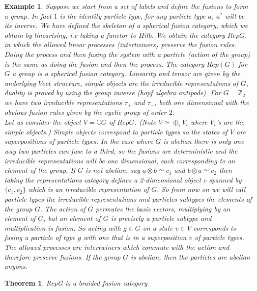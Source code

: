 \documentclass{article}
\newtheorem{example}{Example}
\newtheorem{theorem}{Theorem}
\begin{document}
\begin{example}
Suppose we start from a set of labels and define the fusions to form a group. In fact $1$ is the identity particle type, for any particle type $a$, $a^*$ will be its inverse. We have defined the skeleton of a spherical fusion category, which we obtain by linearising, i.e taking a functor to $Hilb$. We obtain the category $RepG$, in which the allowed linear processes (intertwiners) preserve the fusion rules. Doing the process and then fusing the system with a particle (action of the group) is the same as doing the fusion and then the process. 
The category $Rep(G)$ for $G$ a group is a spherical fusion category. Linearity and tensor are given by the underlying $Vect$ structure, simple objects are the irreducible representations of $G$, duality is proved by using the group inverse (hopf algebra antipode). For $G=\mathbb{Z}_2$ we have two irreducible representations $\tau_+$ and $\tau_-$, both one dimensional with the obvious fusion rules given by the cyclic group of order $2$.\\
Let us consider the object $V=\mathbb{C}G$ of $RepG$. (Note $V \simeq \oplus_i V_i$ where $V_i$'s are the simple objects.) Simple objects correspond to particle types so the states of $V$ are superpositions of particle types. In the case where $G$ is abelian there is only one way two particles can fuse to a third, so the fusions are deterministic and the irreducible representations will be one dimensional, each corresponding to an element of the group. If $G$ is not abelian, say $a\otimes b \simeq c_1$ and $b \otimes a \simeq c_2$ then taking the representations category defines a 2-dimensional object $c$ spanned by $\{c_1,c_2\}$ which is an irreducible representation of $G$. So from now on we will call particle types the irreducible representations and particles subtypes the elements of the group $G$.  The action of $G$ permutes the basis vectors, multiplying by an element of $G$, but an element of $G$ is precisely a particle subtype and multiplication is fusion. So acting with $g \in G$ on a state $v \in V$ corresponds to fusing a particle of type $g$ with one that is in a superposition $v$ of particle types. The allowed processes are intertwiners which commute with the action and therefore preserve fusions. If the group $G$ is abelian, then the particles are abelian anyons.
\end{example}

\begin{theorem}
RepG is a braided fusion category
\end{theorem}
\end{document}
